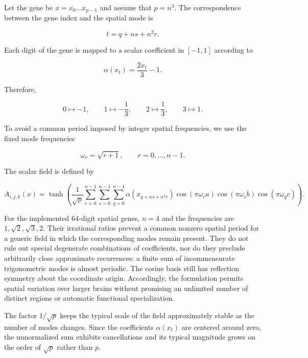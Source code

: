 \documentclass[12pt,a4paper]{article}
\begin{document}
	Let the gene be	$x = x_0 \ldots x_{p-1}$ and assume that $p=n^3$. The correspondence between the gene index and the spatial mode is

	$$t=q+ns+n^2r.$$

	Each digit of the gene is mapped to a scalar coefficient in $[-1,1]$ according to

	$$\alpha(x_t)=\frac{2x_t}{3}-1.$$

	Therefore,

	$$0\mapsto-1,\qquad 1\mapsto-\frac{1}{3},\qquad 2\mapsto\frac{1}{3},\qquad 3\mapsto1.$$

	To avoid a common period imposed by integer spatial frequencies, we use the fixed mode frequencies

	$$\omega_r=\sqrt{r+1},\qquad r=0,\ldots,n-1.$$

	The scalar field is defined by

	\begin{equation}
	A_{i,j,k}(x)=\tanh\left(\frac{1}{\sqrt{p}}\sum_{r=0}^{n-1}\sum_{s=0}^{n-1}\sum_{q=0}^{n-1}\alpha\!\left(x_{q+ns+n^2r}\right)\cos(\pi\omega_r a)\cos(\pi\omega_s b)\cos(\pi\omega_q c)\right).
	\label{A}
	\end{equation}

	For the implemented 64-digit spatial genes, $n=4$ and the frequencies are $1,\sqrt{2},\sqrt{3},2$. Their irrational ratios prevent a common nonzero spatial period for a generic field in which the corresponding modes remain present. They do not rule out special degenerate combinations of coefficients, nor do they preclude arbitrarily close approximate recurrences: a finite sum of incommensurate trigonometric modes is almost periodic. The cosine basis still has reflection symmetry about the coordinate origin. Accordingly, the formulation permits spatial variation over larger brains without promising an unlimited number of distinct regions or automatic functional specialization.
	
	The factor $1/\sqrt{p}$ keeps the typical scale of the field approximately stable as the number of modes changes. Since the coefficients $\alpha(x_t)$ are centered around zero, the unnormalized sum exhibits cancellations and its typical magnitude grows on the order of $\sqrt{p}$ rather than $p$.
	
\end{document}
